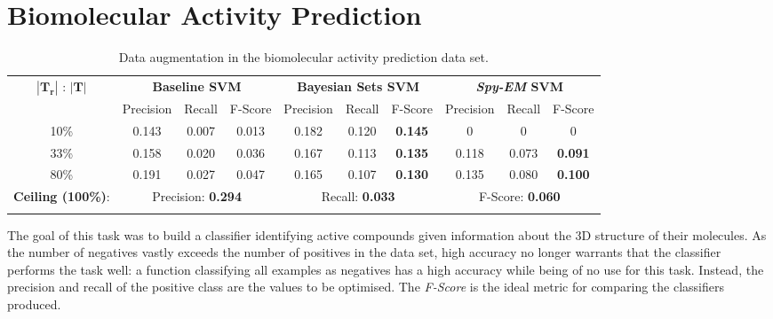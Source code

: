 \documentclass[12pt,twoside,notitlepage,amsart]{report} %
\begin{document}
	
\section{Biomolecular Activity Prediction}


	\begin{table}
	
	\begin{center}
	
	\caption{Data augmentation in the biomolecular activity prediction data set.}
	
	\begin{adjustbox}{center}
	\renewcommand{\arraystretch}{1.6}
	\begin{tabular}{||c||c c c||c c c||c c c|| }
	
	\hline
	
	\multirow{2}{*}{$|\mathbf{T_r}|$ : $|\mathbf{T}|$ } & \multicolumn{3}{|c||}{\textbf{Baseline SVM}} & \multicolumn{3}{|c||}{\textbf{Bayesian Sets SVM}} & \multicolumn{3}{|c||}{\textbf{\emph{Spy-EM} SVM}}\\\cline{2-10}
	
	& Precision & Recall & F-Score & Precision & Recall & F-Score & Precision & Recall & F-Score \\
	\hline \hline
	10\%  & 0.143 &	0.007 &	0.013  & 0.182  &	0.120 &	\textbf{0.145}  &  0     &  0     &  0   \\ \hline
	33\%  & 0.158 & 0.020	& 0.036  & 	0.167	& 0.113 &	\textbf{0.135}  &  0.118 &	0.073	 &  \textbf{0.091}  \\ \hline 
	80\%  & 0.191	& 0.027	& 0.047  & 	0.165 &	0.107 &	\textbf{0.130}  &  0.135 &	0.080  &	\textbf{0.100}     \\ \hline 
	\hline
	\textbf{\small{Ceiling (100\%)}}: & \multicolumn{3}{|c}{ Precision: \textbf{0.294} } & \multicolumn{3}{c}{Recall: 	\textbf{0.033}   } & \multicolumn{3}{c||}{F-Score: \textbf{0.060}	 } \\
	}                                                             
	\hline  
	
	\end{tabular}
	\end{adjustbox}
	\end{center}
	\end{table}


The goal of this task was to build a classifier identifying active compounds given information about the 3D structure of their molecules. As the number of negatives vastly exceeds the number of positives in the data set, high accuracy no longer warrants that the classifier performs the task well: a function classifying all examples as negatives has a high accuracy while being of no use for this task. Instead, the precision and recall of the positive class are the values to be optimised. The \emph{F-Score} is the ideal metric for comparing the classifiers produced.
\end{document}
